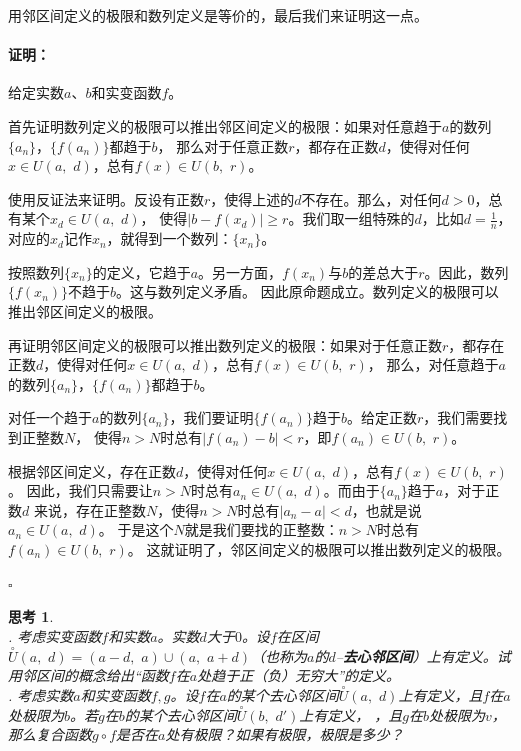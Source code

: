 \documentclass[12pt,UTF8]{ctexbook}
\newtheorem{sk}{思考}[section]
\renewenvironment{proof}{\paragraph{\textbf{证明：}}}{\hfill$\square$}
\begin{document}
用邻区间定义的极限和数列定义是等价的，最后我们来证明这一点。
\begin{proof}
    给定实数$a$、$b$和实变函数$f$。

    首先证明数列定义的极限可以推出邻区间定义的极限：如果对任意趋于$a$的数列$\{a_n\}$，$\{f(a_n)\}$都趋于$b$，
    那么对于任意正数$r$，都存在正数$d$，使得对任何$x\in U(a,\,\, d)$，总有$f(x)\in U(b,\,\,r)$。

    使用反证法来证明。反设有正数$r$，使得上述的$d$不存在。那么，对任何$d>0$，总有某个$x_d\in U(a,\,\, d)$，
    使得$ |b - f(x_d)| \geqslant r$。我们取一组特殊的$d$，比如$d = \frac{1}{n}$，对应的$x_d$记作$x_n$，就得到一个数列：$\{x_n\}$。
    
    按照数列$\{x_n\}$的定义，它趋于$a$。另一方面，$f(x_n)$与$b$的差总大于$r$。因此，数列$\{f(x_n)\}$不趋于$b$。这与数列定义矛盾。
    因此原命题成立。数列定义的极限可以推出邻区间定义的极限。

    再证明邻区间定义的极限可以推出数列定义的极限：如果对于任意正数$r$，都存在正数$d$，使得对任何$x\in U(a,\,\, d)$，总有$f(x)\in U(b,\,\,r)$，
    那么，对任意趋于$a$的数列$\{a_n\}$，$\{f(a_n)\}$都趋于$b$。

    对任一个趋于$a$的数列$\{a_n\}$，我们要证明$\{f(a_n)\}$趋于$b$。给定正数$r$，我们需要找到正整数$N$，
    使得$n>N$时总有$|f(a_n) - b| < r$，即$f(a_n)\in U(b,\,\,r)$。
    
    根据邻区间定义，存在正数$d$，使得对任何$x\in U(a,\,\, d)$，总有$f(x)\in U(b,\,\,r)$。
    因此，我们只需要让$n>N$时总有$a_n\in U(a,\,\, d)$。而由于$\{a_n\}$趋于$a$，对于正数$d$
    来说，存在正整数$N$，使得$n>N$时总有$|a_n - a| < d$，也就是说$a_n\in U(a,\,\, d)$。
    于是这个$N$就是我们要找的正整数：$n>N$时总有$f(a_n)\in U(b,\,\,r)$。
    这就证明了，邻区间定义的极限可以推出数列定义的极限。

\end{proof}

\begin{sk}
    \mbox{} \\
    . 考虑实变函数$f$和实数$a$。实数$d$大于$0$。设$f$在区间$\overset{\circ}{U}(a,\,\,d) = (a-d,\,\,a)\cup (a,\,\,a+d)$（也称为$a$的$d$–\textbf{去心邻区间}）上有定义。试用邻区间的概念给出“函数$f$在$a$处趋于正（负）无穷大”的定义。\\
    . 考虑实数$a$和实变函数$f, g$。设$f$在$a$的某个去心邻区间$\overset{\circ}{U}(a,\,\,d)$上有定义，且$f$在$a$处极限为$b$。若$g$在$b$的某个去心邻区间$\overset{\circ}{U}(b,\,\,d')$上有定义，
    ，且$g$在$b$处极限为$v$，那么复合函数$g\circ f$是否在$a$处有极限？如果有极限，极限是多少？
\end{sk}
\end{document}
